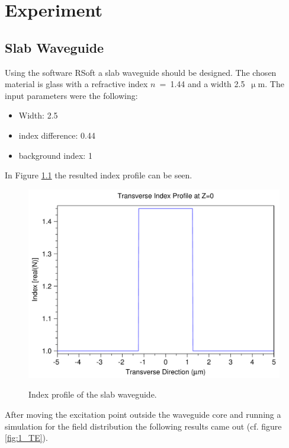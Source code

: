 \chapter{Experiment}
\section{Slab Waveguide}
Using the software RSoft a slab waveguide should be designed. The chosen material is glass with a refractive index $n$~=~1.44 and a width 2.5~$\upmu$m.  The input parameters were the following:
\begin{itemize}
	\item Width: 2.5
	\item index difference: 0.44
	\item background index: 1
 \end{itemize}

In Figure \ref{fig:1_index} the resulted index profile can be seen.
\begin{figure}[h]%
\centering
\includegraphics[totalheight=5.5 cm]{Grafiken/1_index.pdf}%
\label{fig:1_index}%
\caption{Index profile of the slab waveguide.}
\end{figure}

After moving the excitation point outside the waveguide core and running a simulation for the field distribution the following results came out (cf. figure \ref{fig:1_TE}).


